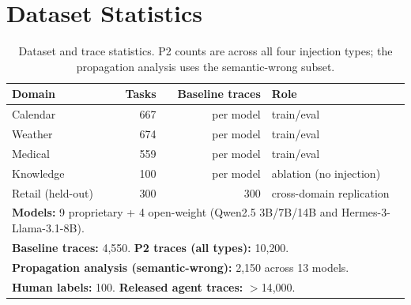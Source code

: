 \documentclass[11pt]{article}
\begin{document}
\section{Dataset Statistics}
\begin{table}[h]\centering
\caption{Dataset and trace statistics. P2 counts are across all four injection
types; the propagation analysis uses the semantic-wrong subset.}
\begin{tabular}{lrrl}
\toprule
Domain & Tasks & Baseline traces & Role \\
\midrule
Calendar & 667 & per model & train/eval \\
Weather  & 674 & per model & train/eval \\
Medical  & 559 & per model & train/eval \\
Knowledge & 100 & per model & ablation (no injection) \\
Retail (held-out) & 300 & 300 & cross-domain replication \\
\midrule
\multicolumn{4}{l}{\textbf{Models:} 9 proprietary + 4 open-weight (Qwen2.5
3B/7B/14B and Hermes-3-Llama-3.1-8B).} \\
\multicolumn{4}{l}{\textbf{Baseline traces:} 4{,}550. \textbf{P2 traces
(all types):} 10{,}200.} \\
\multicolumn{4}{l}{\textbf{Propagation analysis (semantic-wrong):} 2{,}150
across 13 models.} \\
\multicolumn{4}{l}{\textbf{Human labels:} 100. \textbf{Released agent traces:}
$>$14{,}000.} \\
\bottomrule
\end{tabular}
\end{table}
\end{document}
